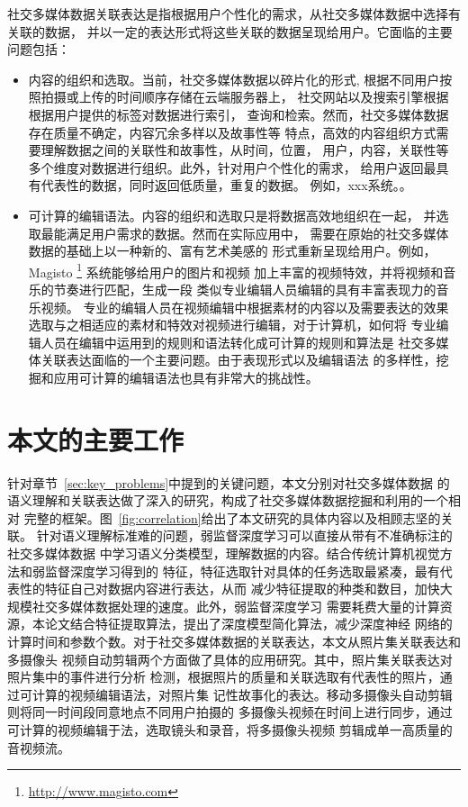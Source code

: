 社交多媒体数据关联表达是指根据用户个性化的需求，从社交多媒体数据中选择有关联的数据，
并以一定的表达形式将这些关联的数据呈现给用户。它面临的主要问题包括：
\begin{itemize}
    \item 内容的组织和选取。当前，社交多媒体数据以碎片化的形式,
        根据不同用户按照拍摄或上传的时间顺序存储在云端服务器上，
        社交网站以及搜索引擎根据根据用户提供的标签对数据进行索引，
        查询和检索。然而，社交多媒体数据存在质量不确定，内容冗余多样以及故事性等
        特点，高效的内容组织方式需要理解数据之间的关联性和故事性，从时间，位置，
        用户，内容，关联性等多个维度对数据进行组织。此外，针对用户个性化的需求，
        给用户返回最具有代表性的数据，同时返回低质量，重复的数据。
        例如，xxx系统。。

    \item 可计算的编辑语法。内容的组织和选取只是将数据高效地组织在一起，
        并选取最能满足用户需求的数据。然而在实际应用中，
        需要在原始的社交多媒体数据的基础上以一种新的、富有艺术美感的
        形式重新呈现给用户。例如，Magisto
        \footnote{\url{http://www.magisto.com}}
        系统能够给用户的图片和视频
        加上丰富的视频特效，并将视频和音乐的节奏进行匹配，生成一段
        类似专业编辑人员编辑的具有丰富表现力的音乐视频。
        专业的编辑人员在视频编辑中根据素材的内容以及需要表达的效果
        选取与之相适应的素材和特效对视频进行编辑，对于计算机，如何将
        专业编辑人员在编辑中运用到的规则和语法转化成可计算的规则和算法是
        社交多媒体关联表达面临的一个主要问题。由于表现形式以及编辑语法
        的多样性，挖掘和应用可计算的编辑语法也具有非常大的挑战性。

\end{itemize}

\section{本文的主要工作}
针对章节~\ref{sec:key_problems}中提到的关键问题，本文分别对社交多媒体数据
的语义理解和关联表达做了深入的研究，构成了社交多媒体数据挖掘和利用的一个相对
完整的框架。图~\ref{fig:correlation}给出了本文研究的具体内容以及相顾志坚的关联。
针对语义理解标准难的问题，弱监督深度学习可以直接从带有不准确标注的社交多媒体数据
中学习语义分类模型，理解数据的内容。结合传统计算机视觉方法和弱监督深度学习得到的
特征，特征选取针对具体的任务选取最紧凑，最有代表性的特征自己对数据内容进行表达，从而
减少特征提取的种类和数目，加快大规模社交多媒体数据处理的速度。此外，弱监督深度学习
需要耗费大量的计算资源，本论文结合特征提取算法，提出了深度模型简化算法，减少深度神经
网络的计算时间和参数个数。对于社交多媒体数据的关联表达，本文从照片集关联表达和多摄像头
视频自动剪辑两个方面做了具体的应用研究。其中，照片集关联表达对照片集中的事件进行分析
检测，根据照片的质量和关联选取有代表性的照片，通过可计算的视频编辑语法，对照片集
记性故事化的表达。移动多摄像头自动剪辑则将同一时间段同意地点不同用户拍摄的
多摄像头视频在时间上进行同步，通过可计算的视频编辑于法，选取镜头和录音，将多摄像头视频
剪辑成单一高质量的音视频流。

